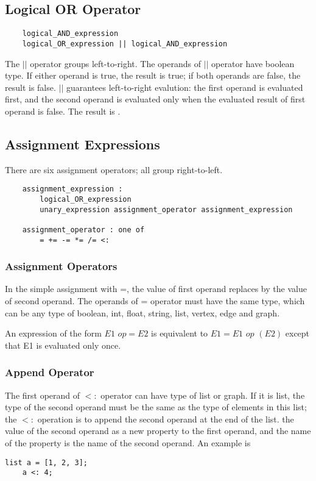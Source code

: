 \documentclass[letterpaper,12pt]{article}
\begin{document}
\subsection{Logical OR Operator}
\begin{lstlisting}
	logical_AND_expression
	logical_OR_expression || logical_AND_expression
\end{lstlisting}
The $||$ operator groups left-to-right. The operands of $||$ operator have boolean type. If either operand is true, the result is true; if both operands are false, the result is false. $||$ guarantees left-to-right evalution: the first operand is evaluated first, and the second operand is evaluated only when the evaluated result of first operand is false. The result is {}.

\subsection{Assignment Expressions}
There are six assignment operators; all group right-to-left.
\begin{lstlisting}
	assignment_expression :
		logical_OR_expression
		unary_expression assignment_operator assignment_expression

	assignment_operator : one of
		= += -= *= /= <:
\end{lstlisting}
\subsubsection{Assignment Operators}
In the simple assignment with =, the value of first operand replaces by the value of second operand. The operands of = operator must have the same type, which can be any type of boolean, int, float, string, list, vertex, edge and graph.\newline

An expression of the form $E1$ $op= E2$ is equivalent to $E1 = E1$ $op$ $(E2)$ except that E1 is evaluated only once.

\subsubsection{Append Operator}\label{sec:append}
The first operand of $<:$ operator can have type of list or graph. If it is list, the type of the second operand must be the same as the type of elements in this list; the $<:$ operation is to append the second operand at the end of the list. 
the value of the second operand as a new property to the first operand, and the name of the property is the name of the second operand. An example is
\begin{lstlisting}[frame=none]
	list a = [1, 2, 3];
	a <: 4;
\end{lstlisting}
\end{document}
